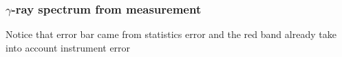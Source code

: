 \documentclass{beamer}
\begin{document}





\begin{frame}
\frametitle{$\gamma$-ray spectrum from measurement}


\begin{figure}[h!]
\end{figure}
Notice that error bar came from statistics error and the red band already take into account
instrument error
\end{frame}
\end{document}
